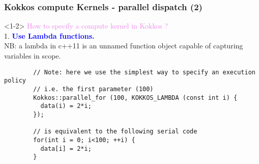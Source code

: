 \begin{frame}[fragile]
  \frametitle{Kokkos compute Kernels - parallel dispatch (2)}

  \begin{onlyenv}<1-2>
    {\large \textcolor{violet}{How to specify a compute kernel in Kokkos ?}}\\
    {\large 1. \textcolor{blue}{\textbf{Use Lambda functions.}}}\\
    NB: a lambda in c++11 is an unnamed function object capable of capturing variables in scope.
    {\small
      \begin{verbatim}
        // Note: here we use the simplest way to specify an execution policy
        // i.e. the first parameter (100)
        Kokkos::parallel_for (100, KOKKOS_LAMBDA (const int i) {
          data(i) = 2*i;
        });
        
        // is equivalent to the following serial code
        for(int i = 0; i<100; ++i) {
          data[i] = 2*i;
        }
      \end{verbatim}
    }
  \end{onlyenv}

\end{frame}

